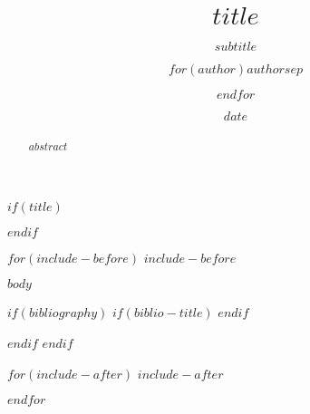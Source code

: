 \documentclass[12pt,letterpaper,$endif$$if(lang)$$babel-lang$,$endif$$for(classoption)$$classoption$$sep$,$endfor$]{article}
\title{$title$}
\subtitle{$subtitle$}
\author{$for(author)$$author$$sep$ \and $endfor$}
\date{$date$}
\begin{document}
$if(title)$
\maketitle
$endif$

\begin{abstract}
$abstract$
\end{abstract}
\clearpage

$for(include-before)$
$include-before$

$body$

$if(bibliography)$
$if(biblio-title)$
\renewcommand\refname{$biblio-title$}
$endif$

$endif$
$endif$

$for(include-after)$
$include-after$

$endfor$
\end{document}
